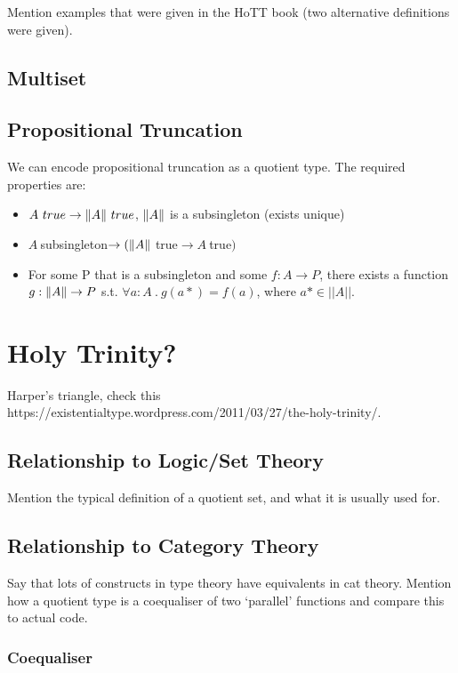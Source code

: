 \documentclass[11pt]{article}
\DeclarePairedDelimiter{\norm}{\lVert}{\rVert}
\begin{document}
Mention examples that were given in the HoTT book (two alternative definitions were given).

\subsection{Multiset}
\subsection{Propositional Truncation}

We can encode propositional truncation as a quotient type. The required properties are:

\begin{itemize}
	\item $A \ true \rightarrow \norm{A} \ true$, $\norm{A}$ is a subsingleton (exists unique)
	\item $A  \ $subsingleton$ \rightarrow (\norm{A} \ $true$ \rightarrow A \ $true$)$
	\item For some P that is a subsingleton and some $f :  A \rightarrow P$, there exists a function $g : \norm{A} \rightarrow P$ s.t. $ \forall a : A \ . \ g(a*) = f(a)$, where $ a* \in ||A||$.
\end{itemize}

\section{Holy Trinity?}
Harper's triangle, check this https://existentialtype.wordpress.com/2011/03/27/the-holy-trinity/.

\subsection{Relationship to Logic/Set Theory}
Mention the typical definition of a quotient set, and what it is usually used for.

\subsection{Relationship to Category Theory}
Say that lots of constructs in type theory have equivalents in cat theory. Mention how a quotient type is a coequaliser of two `parallel' functions and compare this to actual code.


\subsubsection{Coequaliser}
\end{document}
